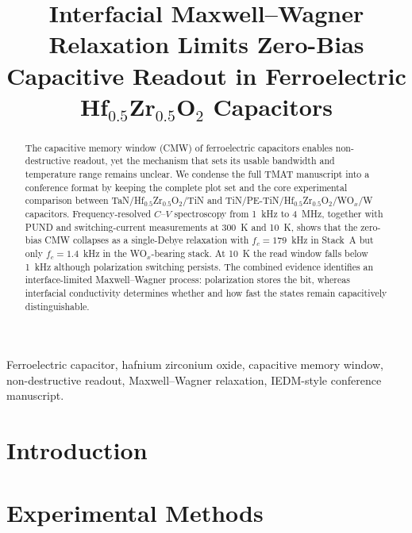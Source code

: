 \documentclass[conference]{IEEEtran}
\newcommand{\hzo}{Hf$_{0.5}$Zr$_{0.5}$O$_2$}
\newcommand{\fc}{f_{c}}
\begin{document}
\title{Interfacial Maxwell--Wagner Relaxation Limits Zero-Bias Capacitive Readout in Ferroelectric \hzo{} Capacitors}

\author{
}

\maketitle

\begin{abstract}
The capacitive memory window (CMW) of ferroelectric capacitors enables non-destructive readout, yet the mechanism that sets its usable bandwidth and temperature range remains unclear. We condense the full TMAT manuscript into a conference format by keeping the complete plot set and the core experimental comparison between TaN/\hzo{}/TiN and TiN/PE-TiN/\hzo{}/WO$_x$/W capacitors. Frequency-resolved $C$--$V$ spectroscopy from 1~kHz to 4~MHz, together with PUND and switching-current measurements at 300~K and 10~K, shows that the zero-bias CMW collapses as a single-Debye relaxation with $\fc = 179$~kHz in Stack~A but only $\fc = 1.4$~kHz in the WO$_x$-bearing stack. At 10~K the read window falls below 1~kHz although polarization switching persists. The combined evidence identifies an interface-limited Maxwell--Wagner process: polarization stores the bit, whereas interfacial conductivity determines whether and how fast the states remain capacitively distinguishable.
\end{abstract}

\begin{IEEEkeywords}
Ferroelectric capacitor, hafnium zirconium oxide, capacitive memory window, non-destructive readout, Maxwell--Wagner relaxation, IEDM-style conference manuscript.
\end{IEEEkeywords}

\section{Introduction}


\section{Experimental Methods}

\end{document}
